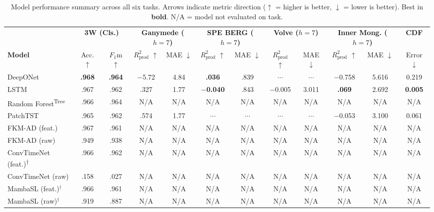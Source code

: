 \documentclass[11pt]{article}
\newcommand{\best}[1]{\textbf{#1}}
\newcommand{\treemodel}{\textsuperscript{Tree}}
\newcommand{\hpo}{\textsuperscript{$\dagger$}}
\newcommand{\rp}{R^2_\text{prod}}
\begin{document}
\begin{table}[ht]
\centering
\caption{Model performance summary across all six tasks.
Arrows indicate metric direction ($\uparrow$ = higher is better, $\downarrow$ = lower is better).
Best in \textbf{bold}. N/A = model not evaluated on task.}
\label{tab:summary_all}
\small
\setlength{\tabcolsep}{2pt}
\begin{tabular}{@{}l cc cc cc cc cc c@{}}
\toprule
 & \multicolumn{2}{c}{\textbf{3W (Cls.)}} & \multicolumn{2}{c}{\textbf{Ganymede ($h{=}7$)}} & \multicolumn{2}{c}{\textbf{SPE BERG ($h{=}7$)}} & \multicolumn{2}{c}{\textbf{Volve ($h{=}7$)}} & \multicolumn{2}{c}{\textbf{Inner Mong. ($h{=}7$)}} & \textbf{CDF} \\
\cmidrule(lr){2-3} \cmidrule(lr){4-5} \cmidrule(lr){6-7} \cmidrule(lr){8-9} \cmidrule(lr){10-11} \cmidrule(lr){12-12}
\textbf{Model} & Acc. $\uparrow$ & $F_1$m $\uparrow$ & $\rp$ $\uparrow$ & MAE $\downarrow$ & $\rp$ $\uparrow$ & MAE $\downarrow$ & $\rp$ $\uparrow$ & MAE $\downarrow$ & $\rp$ $\uparrow$ & MAE $\downarrow$ & Error $\downarrow$ \\
\midrule
DeepONet     & \best{.968} & \best{.964} & $-$5.72 & 4.84 & \best{.036} & .839 & $\cdots$ & $\cdots$ & $-$0.758 & 5.616 & 0.219 \\
LSTM         & .967 & .962 & .327 & 1.77 & \best{$-$0.040} & .843 & $-$0.005 & 3.011 & \best{.069} & 2.692 & \best{0.005} \\
Random Forest\treemodel & .966 & .964 & N/A & N/A & N/A & N/A & N/A & N/A & N/A & N/A & N/A \\
PatchTST     & .965 & .962 & .574 & 1.77 & $\cdots$ & $\cdots$ & $\cdots$ & $\cdots$ & $-$0.053 & 3.100 & 0.061 \\
FKM-AD (feat.) & .967 & .961 & N/A & N/A & N/A & N/A & N/A & N/A & N/A & N/A & N/A \\
FKM-AD (raw)   & .949 & .938 & N/A & N/A & N/A & N/A & N/A & N/A & N/A & N/A & N/A \\
ConvTimeNet (feat.)\hpo & .966 & .962 & N/A & N/A & N/A & N/A & N/A & N/A & N/A & N/A & N/A \\
ConvTimeNet (raw)       & .158 & .027 & N/A & N/A & N/A & N/A & N/A & N/A & N/A & N/A & N/A \\
MambaSL (feat.)$^\dagger$ & .966 & .961 & N/A & N/A & N/A & N/A & N/A & N/A & N/A & N/A & N/A \\
MambaSL (raw)$^\dagger$   & .919 & .887 & N/A & N/A & N/A & N/A & N/A & N/A & N/A & N/A & N/A \\

\end{tabular}
\end{table}
\end{document}
